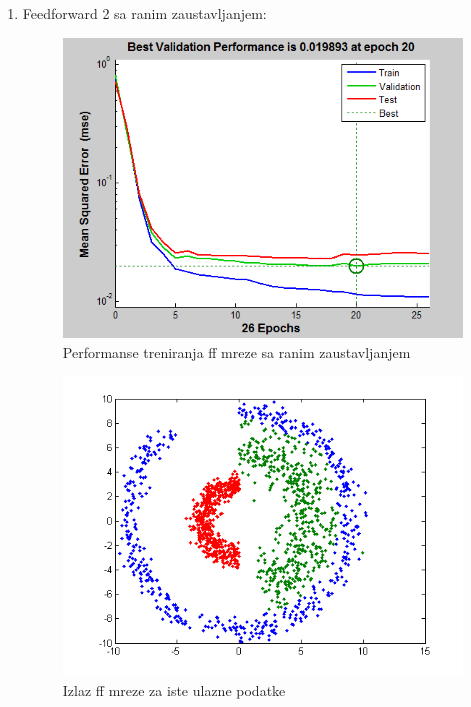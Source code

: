 \documentclass{report}
\begin{document}
\begin{enumerate}
\begin{enumerate}
\newpage
\item\LARGE
Feedforward 2 sa ranim zaustavljanjem:\large

\begin{figure}[!h]
\begin{center}
\includegraphics[scale=0.8]{B1performanceFF2early.png}
\caption{Performanse treniranja ff mreze sa ranim zaustavljanjem}
\end{center}
\end{figure}

\begin{figure}[!h]
\begin{center}
\includegraphics[scale=0.8]{B1outputFF2earlySame.png}
\caption{Izlaz ff mreze za iste ulazne podatke}
\end{center}
\end{figure}


\end{enumerate}
\end{enumerate}
\end{document}
